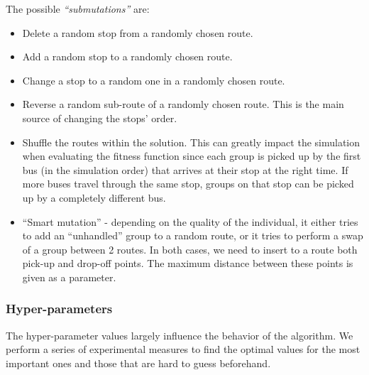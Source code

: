 The possible \textit{``submutations''} are:
\begin{itemize}
    \setlength\itemsep{0pt}
    \item Delete a random stop from a randomly chosen route.
    \item Add a random stop to a randomly chosen route.
    \item Change a stop to a random one in a randomly chosen route.
    \item Reverse a random sub-route of a randomly chosen route. This is the main source of changing the stops' order.
    \item Shuffle the routes within the solution. This can greatly impact the simulation when evaluating the fitness function since each group is picked up by the first bus (in the simulation order) that arrives at their stop at the right time. If more buses travel through the same stop, groups on that stop can be picked up by a completely different bus.
    \item ``Smart mutation'' - depending on the quality of the individual, it either tries to add an ``unhandled'' group to a random route, or it tries to perform a swap of a group between 2 routes. In both cases, we need to insert to a route both pick-up and drop-off points. The maximum distance between these points is given as a parameter.
\end{itemize}

\subsubsection{Hyper-parameters}

The hyper-parameter values largely influence the behavior of the algorithm. We perform a series of experimental measures to find the optimal values for the most important ones and those that are hard to guess beforehand.

